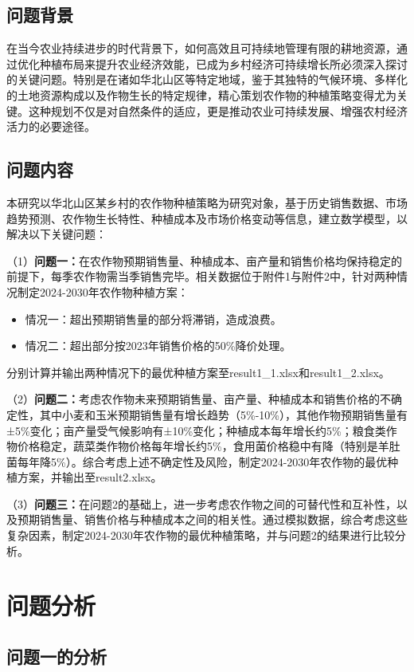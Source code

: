 \documentclass{cumcmthesis}
\begin{document}
\subsection{问题背景}

在当今农业持续进步的时代背景下，如何高效且可持续地管理有限的耕地资源，通过优化种植布局来提升农业经济效能，已成为乡村经济可持续增长所必须深入探讨的关键问题。特别是在诸如华北山区等特定地域，鉴于其独特的气候环境、多样化的土地资源构成以及作物生长的特定规律，精心策划农作物的种植策略变得尤为关键。这种规划不仅是对自然条件的适应，更是推动农业可持续发展、增强农村经济活力的必要途径。

\subsection{问题内容}

本研究以华北山区某乡村的农作物种植策略为研究对象，基于历史销售数据、市场趋势预测、农作物生长特性、种植成本及市场价格变动等信息，建立数学模型，以解决以下关键问题：

（1）\textbf{问题一：}在农作物预期销售量、种植成本、亩产量和销售价格均保持稳定的前提下，每季农作物需当季销售完毕。相关数据位于附件1与附件2中，针对两种情况制定2024-2030年农作物种植方案：
\begin{itemize}
\item 情况一：超出预期销售量的部分将滞销，造成浪费。
\item 情况二：超出部分按2023年销售价格的50\%降价处理。
\end{itemize}

分别计算并输出两种情况下的最优种植方案至result1\_1.xlsx和result1\_2.xlsx。

（2）\textbf{问题二：}考虑农作物未来预期销售量、亩产量、种植成本和销售价格的不确定性，其中小麦和玉米预期销售量有增长趋势（5\%-10\%），其他作物预期销售量有±5\%变化；亩产量受气候影响有±10\%变化；种植成本每年增长约5\%；粮食类作物价格稳定，蔬菜类作物价格每年增长约5\%，食用菌价格稳中有降（特别是羊肚菌每年降5\%）。综合考虑上述不确定性及风险，制定2024-2030年农作物的最优种植方案，并输出至result2.xlsx。

（3）\textbf{问题三：}在问题2的基础上，进一步考虑农作物之间的可替代性和互补性，以及预期销售量、销售价格与种植成本之间的相关性。通过模拟数据，综合考虑这些复杂因素，制定2024-2030年农作物的最优种植策略，并与问题2的结果进行比较分析。
\section{问题分析}

\subsection{问题一的分析}
\end{document}
